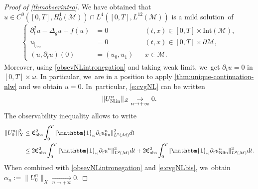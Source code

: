 \documentclass[JEP,XML,SOM,Unicode,published]{cedram}
\newcommand{\lin}{\textup{lin}}
\newcommand{\Nlin}{\textup{Nlin}}
\theoremstyle{definition}
\let\mc\mathcal
\newcommand{\M}{\mc{M}}
\providecommand{\norm}[1]{\lVert#1\rVert}
\begin{document}
\begin{proof}[Proof of \cref{thmobserintro}]
We have obtained that $u\in C^{0}([0, T],H_0^1(\M))\cap L^{4}([0, T],L^{12}(\M))$ is a mild solution~of
\begin{align*}
\left\{\begin{aligned}
\partial_t^2 u-\Delta_g u+f(u)&=0 &&(t, x)\in [0, T]\times \text{Int}(\M),\\
u_{|_{\partial\M}}&=0 &&(t, x)\in [0, T]\times\partial\M,\\
(u, \partial_t u)(0)&=(u_0, u_1)&&x\in \M .
\end{aligned}\right.
\end{align*}
Moreover, using \eqref{obsevNLintronegation} and taking weak limit, we~get $\partial_t u=0$ in $[0, T]\times\omega$.
In particular, we~are in a position to apply \cref{thm:unique-continuation-nlw} and we obtain $u=0$. In~particular, \eqref{e:cvgNL} can be written
\begin{align}
\label{e:cvgNLbis}
\norm{U_{\Nlin}^n}_{\mc{Z}}\underset{n\to +\infty}{\to}0.
\end{align}
The observability inequality allows to write
\begin{align*}
\norm{U_0^n}_{X}^2 &\leq \mathfrak{C}_{\textup{obs}}^2\int_0^T \norm{\mathbbm{1}_\omega\partial_t u_{\lin}^n}_{L^2(\M)}^2dt\\
&\leq 2\mathfrak{C}_{\textup{obs}}^2\int_0^T \norm{\mathbbm{1}_\omega\partial_t u^n}_{L^2(\M)}^2dt+2\mathfrak{C}_{\textup{obs}}^2\int_0^T \norm{\mathbbm{1}_\omega\partial_t u_{\Nlin}^n}_{L^2(\M)}^2dt.
\end{align*}
When combined with \eqref{obsevNLintronegation} and \eqref{e:cvgNLbis}, we~obtain $\alpha_n:=\norm{U_0^n}_{X}\underset{n\to +\infty}{\to}0$.


\end{proof}
\end{document}
